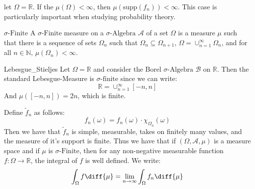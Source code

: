         let $\Omega=\mathbb{R}$. If the $\mu(\Omega)<\infty$,
        then $\mu(\mathrm{supp}(f_{n}))<\infty$. This case is particularly
        important when studying probability theory.
        \begin{ldefinition}{$\sigma\textrm{-Finite}$}
            A $\sigma\textrm{-Finite}$ measure on a
            $\sigma\textrm{-Algebra}$ $\mathcal{A}$ of a set
            $\Omega$ is a measure $\mu$ such that there is a
            sequence of sets $\Omega_{n}$ such that
            $\Omega_{n}\subseteq\Omega_{n+1}$,
            $\Omega=\cup_{n=1}^{\infty}\Omega_{n}$, and for all
            $n\in\mathbb{N}$, $\mu(\Omega_{n})<\infty$.
        \end{ldefinition}
        \begin{lexample}{}{Lebesgue_Stieljes}
            Let $\Omega=\mathbb{R}$ and consider the Borel
            $\sigma\textrm{-Algebra}$ $\mathcal{B}$ on
            $\mathbb{R}$. Then the standard Lebesgue-Measure
            is $\sigma\textrm{-finite}$ since we can write:
            \begin{equation}
                \mathbb{R}=\cup_{n=1}^{\infty}[-n,n]
            \end{equation}
            And $\mu([-n,n])=2n$, which is finite.
        \end{lexample}
        Define $\tilde{f}_{n}$ as follows:
        \begin{equation}
            f_{n}(\omega)
            =f_{n}(\omega)\cdot\chi_{\Omega_{n}}(\omega)
        \end{equation}
        Then we have that $\tilde{f}_{n}$ is simple, measurable,
        takes on finitely many values, and the measure of it's
        support is finite. Thus we have that if
        $(\Omega,\mathcal{A},\mu)$ is a measure space and if
        $\mu$ is $\sigma\textrm{-Finite}$, then for any
        non-negative measurable function
        $f:\Omega\rightarrow\mathbb{R}$, the integral of $f$ is
        well defined. We write:
        \begin{equation}
            \int_{\Omega}f\diff{\mu}=
            \underset{n\rightarrow\infty}{\lim}
            \int_{\Omega}f_{n}\diff{\mu}
        \end{equation}
